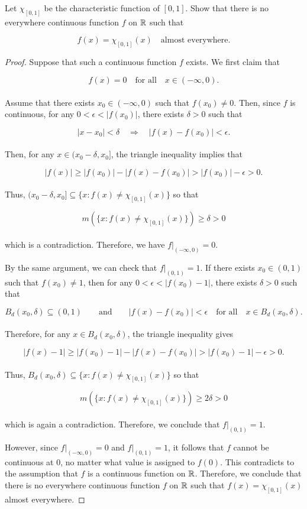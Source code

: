 \documentclass[12pt, a4paper, openany, twoside]{book}
\theoremstyle{definition}
\theoremstyle{remark}
\theoremstyle{plain}
\numberwithin{equation}{section}
\begin{document}
\begin{tcolorbox}[colback=yellow!10!white,colframe=gray!75!black,title=Exercise 1.22]\label{Exercise 1.22}
    Let $\chi_{[0,1]}$ be the characteristic function of $[0,1]$. Show that there is no everywhere continuous function $f$ on ${\mathbb {R}}$ such that 

    \[f(x)=\chi_{[0,1]}(x)\quad\text{almost everywhere}.\]
\end{tcolorbox}
\begin{proof}
    Suppose that such a continuous function $f$ exists. We first claim that 
    
    \[f(x)=0\quad\text{for all}\quad x\in(-\infty,0).\]
    \\
    Assume that there exists $x_0\in(-\infty,0)$ such that $f(x_0)\neq 0$. Then, since $f$ is continuous, for any $0<\epsilon<|f(x_0)|$, there exists $\delta>0$ such that

    \[|x-x_0|<\delta\quad\Longrightarrow\quad |f(x)-f(x_0)|<\epsilon.\]
    \\
    Then, for any $x\in (x_0-\delta,x_0]$, the triangle inequality implies that 

    \[|f(x)|\geq|f(x_0)|-|f(x)-f(x_0)|>|f(x_0)|-\epsilon>0.\]
    \\
    Thus, $(x_0-\delta,x_0]\subseteq\{x:f(x)\neq\chi_{[0,1]}(x)\}$ so that

    \[m\left(\{x:f(x)\neq\chi_{[0,1]}(x)\}\right)\geq\delta>0\]
    \\
    which is a contradiction. Therefore, we have $f|_{(-\infty,0)}=0$.

    By the same argument, we can check that $f|_{(0,1)}=1$. If there exists $x_0\in (0,1)$ such that $f(x_0)\neq 1$, then for any $0<\epsilon<|f(x_0)-1|$, there exists $\delta>0$ such that 
    
    \[B_d(x_0,\delta)\subseteq (0,1)\qquad\text{and}\qquad |f(x)-f(x_0)|<\epsilon\quad\text{for all}\quad x\in B_d(x_0,\delta).\] 
    \\
    Therefore, for any $x\in B_d(x_0,\delta)$, the triangle inequality gives 

    \[|f(x)-1|\geq |f(x_0)-1|-|f(x)-f(x_0)|>|f(x_0)-1|-\epsilon>0.\]
    \\
    Thus, $B_d(x_0,\delta)\subseteq\{x:f(x)\neq\chi_{[0,1]}(x)\}$ so that

    \[m\left(\{x:f(x)\neq\chi_{[0,1]}(x)\}\right)\geq2\delta>0\]
    \\
    which is again a contradiction. Therefore, we conclude that $f|_{(0,1)}=1$.

    However, since $f|_{(-\infty,0)}=0$ and $f|_{(0,1)}=1$, it follows that $f$ cannot be continuous at $0$, no matter what value is assigned to $f(0)$. This contradicts to the assumption that $f$ is a continuous function on ${\mathbb {R}}$. Therefore, we conclude that there is no everywhere continuous function $f$ on ${\mathbb {R}}$ such that $f(x)=\chi_{[0,1]}(x)$ almost everywhere.
\end{proof}
\end{document}

